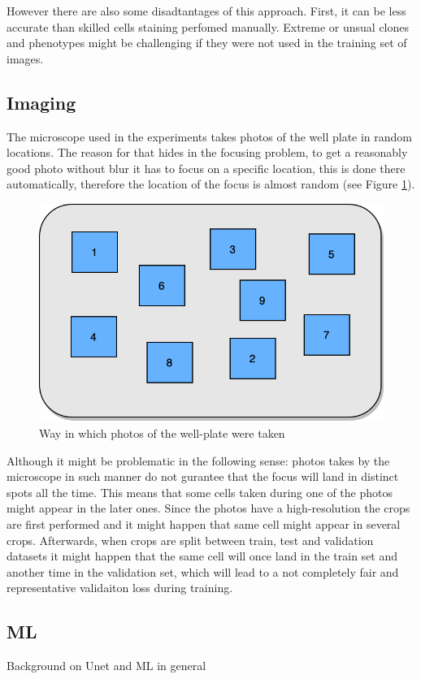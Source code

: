 However there are also some disadtantages of this approach. First, it can be less accurate than skilled cells staining perfomed manually. Extreme or unsual clones and phenotypes might be challenging if they were not used in the training set of images.

\subsection{Imaging}
The microscope used in the experiments takes photos of the well plate in random locations. The reason for that hides in the focusing problem, to get a reasonably good photo without blur it has to focus on a specific location, this is done there automatically, therefore the location of the focus is almost random (see Figure \ref{fig:random-dic}). 

\begin{figure}[htb]
	\begin{center}
		\includegraphics[width=0.5\linewidth]{bilder/dic-random.png}
		\caption{Way in which photos of the well-plate were taken}\label{fig:random-dic}
	\end{center}
\end{figure}


Although it might be problematic in the following sense: photos takes by the microscope in such manner do not gurantee that the focus will land in distinct spots all the time. This means that some cells taken during one of the photos might appear in the later ones. Since the photos have a high-resolution the crops are first performed and it might happen that same cell might appear in several crops. Afterwards, when crops are split between train, test and validation datasets it might happen that the same cell will once land in the train set and another time in the validation set, which will lead to a not completely fair and representative validaiton loss during training.

\subsection{ML}
Background on Unet and ML in general

